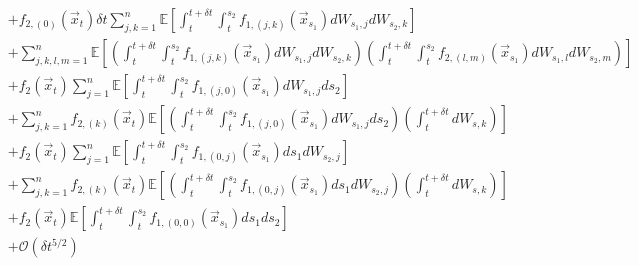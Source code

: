 \documentclass[12pt]{article}
\begin{document}
\begin{equation}
\begin{aligned}
&+ f_{2,(0)}(\vec{x}_t) \delta t  \sum_{j, k=1}^n \mathbb{E} \left[ \int_t^{t+\delta t} \int_t^{s_2} f_{1,(j,k)}(\vec{x}_{s_1}) dW_{s_1, j} dW_{s_2, k} \right]  \\
&+ \sum_{j, k, l, m=1}^n \mathbb{E} \left[ \left( \int_t^{t+\delta t} \int_t^{s_2} f_{1,(j,k)}(\vec{x}_{s_1}) dW_{s_1, j} dW_{s_2, k} \right) \left( \int_t^{t+\delta t} \int_t^{s_2} f_{2,(l,m)}(\vec{x}_{s_1}) dW_{s_1, l} dW_{s_2, m} \right) \right] \\
&+ f_2(\vec{x}_t) \sum_{j=1}^n \mathbb{E} \left[ \int_t^{t+\delta t} \int_t^{s_2} f_{1,(j,0)}(\vec{x}_{s_1}) dW_{s_1, j} ds_2  \right]  \\
&+  \sum_{j, k=1}^n f_{2,(k)}(\vec{x}_t) \mathbb{E} \left[ \left( \int_t^{t+\delta t} \int_t^{s_2} f_{1,(j,0)}(\vec{x}_{s_1}) dW_{s_1, j} ds_2  \right) \left( \int_t^{t + \delta t} dW_{s,k} \right) \right]\\
&+ f_2(\vec{x}_t)  \sum_{j=1}^n \mathbb{E} \left[ \int_t^{t+\delta t} \int_t^{s_2} f_{1,(0,j)}(\vec{x}_{s_1}) ds_1 dW_{s_2, j}  \right]  \\
&+   \sum_{j, k=1}^n  f_{2,(k)}(\vec{x}_t) \mathbb{E} \left[ \left( \int_t^{t+\delta t} \int_t^{s_2} f_{1,(0,j)}(\vec{x}_{s_1}) ds_1 dW_{s_2, j}  \right) \left(\int_t^{t + \delta t} dW_{s,k} \right) \right] \\
&+ f_2(\vec{x}_t) \mathbb{E} \left[ \int_t^{t+\delta t} \int_t^{s_2} f_{1,(0,0)}(\vec{x}_{s_1}) ds_1 ds_2 \right]  \\
&+ \mathcal{O} (\delta t^{5/2})
\end{aligned}
\end{equation}
\end{document}
